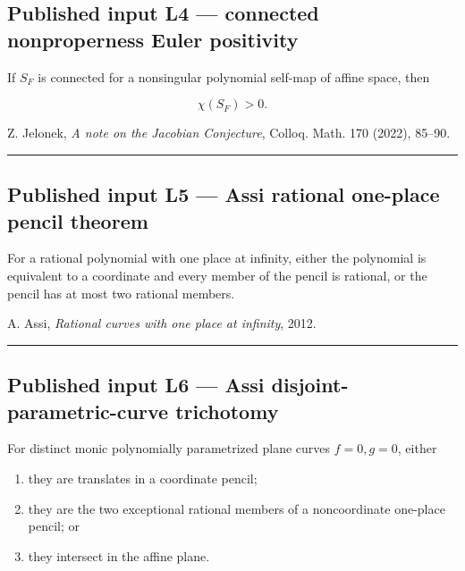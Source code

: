 \subsection{Published input L4 --- connected nonproperness Euler
positivity}\label{published-input-l4-connected-nonproperness-euler-positivity}

If \(S_F\) is connected for a nonsingular polynomial self-map of affine
space, then

\[
\chi(S_F)>0.
\]

Z. Jelonek, \emph{A note on the Jacobian Conjecture}, Colloq. Math. 170
(2022), 85--90.

\begin{center}\rule{0.5\linewidth}{0.5pt}\end{center}

\subsection{Published input L5 --- Assi rational one-place pencil
theorem}\label{published-input-l5-assi-rational-one-place-pencil-theorem}

For a rational polynomial with one place at infinity, either the
polynomial is equivalent to a coordinate and every member of the pencil
is rational, or the pencil has at most two rational members.

A. Assi, \emph{Rational curves with one place at infinity}, 2012.

\begin{center}\rule{0.5\linewidth}{0.5pt}\end{center}

\subsection{Published input L6 --- Assi disjoint-parametric-curve
trichotomy}\label{published-input-l6-assi-disjoint-parametric-curve-trichotomy}

For distinct monic polynomially parametrized plane curves \(f=0,g=0\),
either

\begin{enumerate}
\def\labelenumi{\arabic{enumi}.}
\tightlist
\item
  they are translates in a coordinate pencil;
\item
  they are the two exceptional rational members of a noncoordinate
  one-place pencil; or
\item
  they intersect in the affine plane.
\end{enumerate}


